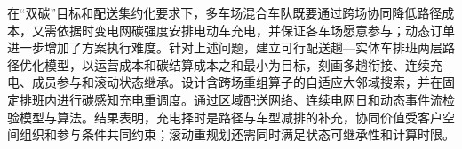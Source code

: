 在“双碳”目标和配送集约化要求下，多车场混合车队既要通过跨场协同降低路径成本，又需依据时变电网碳强度安排电动车充电，并保证各车场愿意参与；动态订单进一步增加了方案执行难度。针对上述问题，建立可行配送趟—实体车排班两层路径优化模型，以运营成本和碳结算成本之和最小为目标，刻画多趟衔接、连续充电、成员参与和滚动状态继承。设计含跨场重组算子的自适应大邻域搜索，并在固定排班内进行碳感知充电重调度。通过区域配送网络、连续电网日和动态事件流检验模型与算法。结果表明，充电择时是路径与车型减排的补充，协同价值受客户空间组织和参与条件共同约束；滚动重规划还需同时满足状态可继承性和计算时限。
